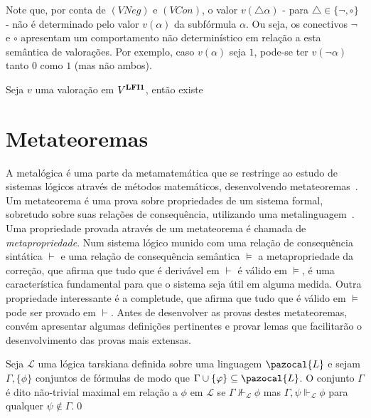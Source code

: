         Note que, por conta de $(VNeg)$ e $(VCon)$, o valor $v(\triangle \alpha)$ {-} para $\triangle \in \{\neg, \circ\}$ {-} não é determinado pelo valor $v(\alpha)$ da subfórmula $\alpha$. Ou seja, os conectivos $\neg$ e $\circ$ apresentam um comportamento não determinístico em relação a esta semântica de valorações. Por exemplo, caso $v(\alpha)$ seja $1$, pode-se ter $v(\neg \alpha)$ tanto $0$ como $1$ (mas não ambos).
        
        \begin{lema}\label{lem:matval}
            Seja $v$ uma valoração em $V^{\textbf{LFI1}{}}$, então existe
        \end{lema}
                
\section{Metateoremas}\label{sec:metateoremas}
    A metalógica é uma parte da metamatemática que se restringe ao estudo de sistemas lógicos através de métodos matemáticos, desenvolvendo metateoremas~\cite{Jacquette2002-JACACT-7}. Um metateorema é uma prova sobre propriedades de um sistema formal, sobretudo sobre suas relações de consequência, utilizando uma metalinguagem~\cite{Tarski1956-TARLSM,Barile_2024}. Uma propriedade provada através de um metateorema é chamada de \textit{metapropriedade}. Num sistema lógico munido com uma relação de consequência sintática $\vdash$ e uma relação de consequência semântica $\vDash$ a metapropriedade da correção, que afirma que tudo que é derivável em $\vdash$ é válido em $\vDash$, é uma característica fundamental para que o sistema seja útil em alguma medida. Outra propriedade interessante é a completude, que afirma que tudo que é válido em $\vDash$ pode ser provado em $\vdash$. Antes de desenvolver as provas destes metateoremas, convém apresentar algumas definições pertinentes e provar lemas que facilitarão o desenvolvimento das provas mais extensas.

    \begin{definicao}\label{def:nao-trivial_maximal}
        Seja $\mathcal{L}$ uma lógica tarskiana definida sobre uma linguagem $\pazocal{L}$ e sejam $\Gamma, \{\phi\}$ conjuntos de fórmulas de modo que $\Gamma \cup \{\phi\} \subseteq \pazocal{L}$. O conjunto $\Gamma$ é dito não-trivial maximal em relação a $\phi$ em $\mathcal{L}$ se $\Gamma \nVdash_{\mathcal{L}} \phi$ mas $\Gamma, \psi \Vdash_{\mathcal{L}} \phi$ para qualquer $\psi \notin \Gamma$.\qed{}
    \end{definicao}

